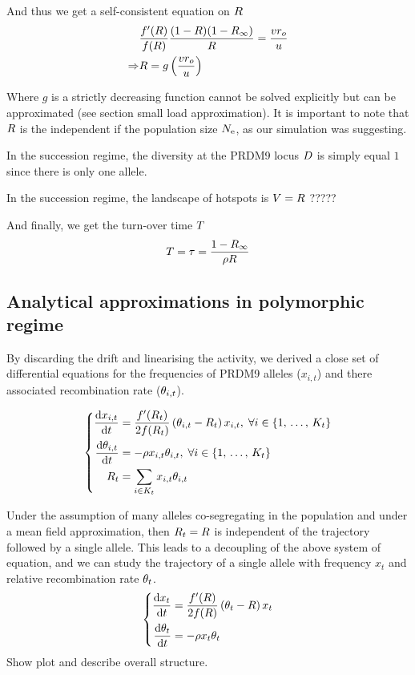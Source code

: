 \documentclass{article}
\begin{document}
And thus we get a self-consistent equation on $R$ 
\begin{align} 
	& \dfrac{f'(R )}{f(R )} \dfrac{(1- R )(1- {R_{\infty}} )}{R } = \dfrac{v r_o}{ u} \\
	\Rightarrow  & R= g\left(\dfrac{v r_o}{ u}\right)
\end{align}

Where $g$ is a strictly decreasing function cannot be solved explicitly but can be approximated (see section small load approximation). 
It is important to note that $R$ is the independent if the population size $N_\mathrm{e}$, as our simulation was suggesting.

In the succession regime, the diversity at the PRDM9 locus $D$ is simply equal $1$ since there is only one allele.

In the succession regime, the landscape of hotspots is $V = R $ ?????

And finally, we get the turn-over time $T$ 
\begin{equation}
  T =  \tau = \dfrac{1 - {R_{\infty}} }{\rho R }
\end{equation}


\subsection*{Analytical approximations in polymorphic regime}

By discarding the drift and linearising the activity, we derived a close set of differential equations for the frequencies of PRDM9 alleles ($x_{i,t}$) and there associated recombination rate ($\theta_{i,t}$). 

\begin{equation}
\left\{
      \begin{aligned}
          \dfrac{\mathrm{d} x_{i,t}}{\mathrm{d} t} &= \dfrac{f'(R_{t} )}{2 f(R_{t} )} \left( \theta_{i,t}  - R_{t}  \right) x_{i,t}, \;
             \forall i \in \{ 1, \, \dots, \, K_{t} \} \\
        \dfrac{\mathrm{d} \theta_{i,t}}{\mathrm{d} t} &= 
        - \rho x_{i,t} \theta_{i,t}, \;
             \forall i \in \{ 1, \, \dots, \, K_{t} \} \\
             R_{t} &= \sum_{i \in K_{t}} x_{i,t} \theta _{i,t} 
      \end{aligned}
\right. 
\end{equation}

Under the assumption of many alleles co-segregating in the population and under a mean field approximation, then $R_{t}=R$ is independent of the trajectory followed by a single allele. This leads to a decoupling of the above system of equation, and we can study the trajectory of a single allele with frequency $x_{t}$ and relative recombination rate $\theta _{t}$.
\begin{equation}
\left\{
      \begin{aligned}
          \dfrac{\mathrm{d} x_{t}}{\mathrm{d} t} &= \dfrac{f'(R )}{2 f(R )} \left( \theta_{t}  - R \right) x_{t} \\
        \dfrac{\mathrm{d} \theta_{t}}{\mathrm{d} t} &= 
        - \rho x_{t} \theta_{t} \\
      \end{aligned}
\right.
\end{equation}
Show plot and describe overall structure.
\end{document}
